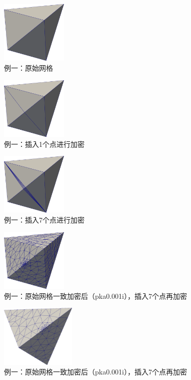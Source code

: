 \begin{figure}[!htbp]
  \centering
  \includegraphics[height=3cm]{fig/2/2.png}
  \caption{例一：原始网格}
  \label{fig:2-1}
\end{figure}

\begin{figure}[!htbp]
  \centering
  \includegraphics[height=3cm]{fig/2/3.png}
  \caption{例一：插入1个点进行加密}
  \label{fig:2-1}
\end{figure}

\begin{figure}[!htbp]
  \centering
  \includegraphics[height=3cm]{fig/2/4.png}
  \caption{例一：插入7个点进行加密}
  \label{fig:2-1}
\end{figure}

\begin{figure}[!htbp]
  \centering
  \includegraphics[height=3cm]{fig/2/5.png}
  \caption{例一：原始网格一致加密后（pka0.001i），插入7个点再加密}
  \label{fig:2-1}
\end{figure}

\begin{figure}[!htbp]
  \centering
  \includegraphics[height=3cm]{fig/2/6.png}
  \caption{例一：原始网格一致加密后（pka0.001i），插入7个点再加密}
  \label{fig:2-1}
\end{figure}

